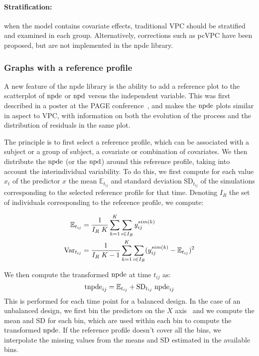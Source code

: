 \paragraph{Stratification:} when the model contains covariate effects, traditional VPC should be stratified and examined in each group. Alternatively, corrections such as pcVPC have been proposed, but are not implemented in the {\sf npde} library.

\subsubsection{Graphs with a reference profile}

\hskip 18pt A new feature of the {\sf npde} library is the ability to add a reference plot to the scatterplot of ${\rm npde}$ or ${\rm npd}$ versus the independent variable. This was first described in a poster at the PAGE conference~\cite{CometsPAGE13}, and makes the ${\rm npde}$ plots similar in aspect to VPC, with information on both the evolution of the process and the distribution of residuals in the same plot. 

The principle is to first select a reference profile, which can be associated with a subject or a group of subject, a covariate or combination of covariates. We then distribute the ${\rm npde}$ (or the ${\rm npd}$) around this reference profile, taking into account the interindividual variability. To do this, we first compute for each value $x_t$ of the predictor $x$ the mean $\mathbb{E}_{t_{ij}}$ and standard deviation SD$_{t_{ij}}$ of the simulations corresponding to the selected reference profile for that time. Denoting $I_R$ the set of individuals corresponding to the reference profile, we compute:

\begin{equation}
\begin{split}
\mathbb{E}_{t_{ij}} &= \frac{1}{I_R \; K} \sum_{k=1}^{K} \sum_{i \in I_R}  y_{ij}^{sim(k)} \\
{\rm Var}_{t_{ij}} &=  \frac{1}{I_R \; K -1}  \sum_{k=1}^{K} \sum_{i \in I_R}  (y_{ij}^{sim(k)} - \mathbb{E}_{t_{ij}})^2 \\
\end{split}
\end{equation}

We then compute the transformed ${\rm npde}$ at time $t_{ij}$ as:
\begin{equation}
{\rm tnpde}_{ij} = \mathbb{E}_{t_{ij}} + {\rm SD}_{t_{ij}} \; {\rm npde}_{ij}
\end{equation}
This is performed for each time point for a balanced design. In the case of an unbalanced design, we first bin the predictors on the $X$ axis~\cite{Lavielle11} and we compute the mean and SD for each bin, which are used within each bin to compute the transformed ${\rm npde}$. If the reference profile doesn't cover all the bins, we interpolate the missing values from the means and SD estimated in the available bins. 

